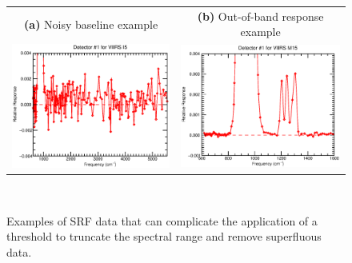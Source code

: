 \begin{figure}[H]
  \centering
  \begin{tabular}{c c}
    \textsf{\textbf{(a)} Noisy baseline example} &
    \textsf{\textbf{(b)} Out-of-band response example} \\
    \includegraphics[bb= 0 15 400 330,clip,scale=0.6]{graphics/noise_example.eps} &
    \includegraphics[bb=15 15 400 330,clip,scale=0.6]{graphics/oobr_example.eps} 
  \end{tabular} \\
  \caption{Examples of SRF data that can complicate the application of a threshold to truncate the spectral range and remove superfluous data.}
  \label{fig:noise_and_oobr_example}
\end{figure}


